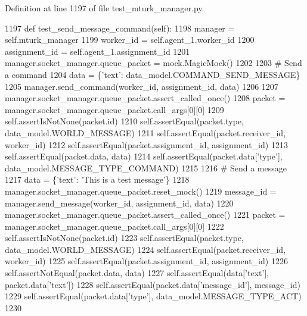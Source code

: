 Definition at line 1197 of file test\+\_\+mturk\+\_\+manager.\+py.


\begin{DoxyCode}
1197     \textcolor{keyword}{def }test\_send\_message\_command(self):
1198         manager = self.mturk\_manager
1199         worker\_id = self.agent\_1.worker\_id
1200         assignment\_id = self.agent\_1.assignment\_id
1201         manager.socket\_manager.queue\_packet = mock.MagicMock()
1202 
1203         \textcolor{comment}{# Send a command}
1204         data = \{\textcolor{stringliteral}{'text'}: data\_model.COMMAND\_SEND\_MESSAGE\}
1205         manager.send\_command(worker\_id, assignment\_id, data)
1206 
1207         manager.socket\_manager.queue\_packet.assert\_called\_once()
1208         packet = manager.socket\_manager.queue\_packet.call\_args[0][0]
1209         self.assertIsNotNone(packet.id)
1210         self.assertEqual(packet.type, data\_model.WORLD\_MESSAGE)
1211         self.assertEqual(packet.receiver\_id, worker\_id)
1212         self.assertEqual(packet.assignment\_id, assignment\_id)
1213         self.assertEqual(packet.data, data)
1214         self.assertEqual(packet.data[\textcolor{stringliteral}{'type'}], data\_model.MESSAGE\_TYPE\_COMMAND)
1215 
1216         \textcolor{comment}{# Send a message}
1217         data = \{\textcolor{stringliteral}{'text'}: \textcolor{stringliteral}{'This is a test message'}\}
1218         manager.socket\_manager.queue\_packet.reset\_mock()
1219         message\_id = manager.send\_message(worker\_id, assignment\_id, data)
1220         manager.socket\_manager.queue\_packet.assert\_called\_once()
1221         packet = manager.socket\_manager.queue\_packet.call\_args[0][0]
1222         self.assertIsNotNone(packet.id)
1223         self.assertEqual(packet.type, data\_model.WORLD\_MESSAGE)
1224         self.assertEqual(packet.receiver\_id, worker\_id)
1225         self.assertEqual(packet.assignment\_id, assignment\_id)
1226         self.assertNotEqual(packet.data, data)
1227         self.assertEqual(data[\textcolor{stringliteral}{'text'}], packet.data[\textcolor{stringliteral}{'text'}])
1228         self.assertEqual(packet.data[\textcolor{stringliteral}{'message\_id'}], message\_id)
1229         self.assertEqual(packet.data[\textcolor{stringliteral}{'type'}], data\_model.MESSAGE\_TYPE\_ACT)
1230 
\end{DoxyCode}
\mbox{\label{classparlai_1_1mturk_1_1core_1_1dev_1_1test_1_1test__mturk__manager_1_1TestMTurkManagerConnectedFunctions_ad5d172db7820f6b3b976a292df305a20}} 
